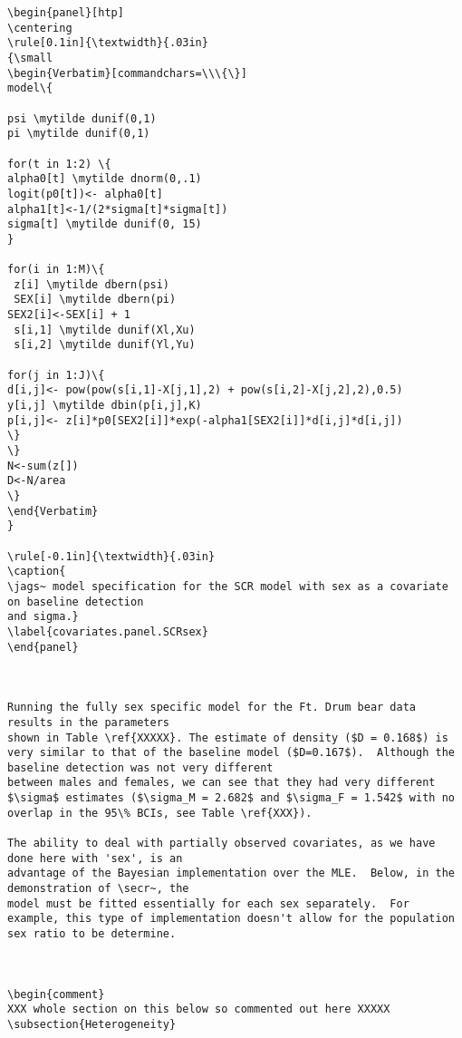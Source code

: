 {\begin{verbatim}
\begin{panel}[htp]
\centering
\rule[0.1in]{\textwidth}{.03in}
{\small
\begin{Verbatim}[commandchars=\\\{\}]
model\{

psi \mytilde dunif(0,1)
pi \mytilde dunif(0,1)

for(t in 1:2) \{
alpha0[t] \mytilde dnorm(0,.1)
logit(p0[t])<- alpha0[t]
alpha1[t]<-1/(2*sigma[t]*sigma[t])
sigma[t] \mytilde dunif(0, 15)
}

for(i in 1:M)\{
 z[i] \mytilde dbern(psi)
 SEX[i] \mytilde dbern(pi)
SEX2[i]<-SEX[i] + 1
 s[i,1] \mytilde dunif(Xl,Xu)
 s[i,2] \mytilde dunif(Yl,Yu)

for(j in 1:J)\{
d[i,j]<- pow(pow(s[i,1]-X[j,1],2) + pow(s[i,2]-X[j,2],2),0.5)
y[i,j] \mytilde dbin(p[i,j],K)
p[i,j]<- z[i]*p0[SEX2[i]]*exp(-alpha1[SEX2[i]]*d[i,j]*d[i,j])
\}
\}
N<-sum(z[])
D<-N/area
\}
\end{Verbatim}
}

\rule[-0.1in]{\textwidth}{.03in}
\caption{
\jags~ model specification for the SCR model with sex as a covariate on baseline detection
and sigma.}
\label{covariates.panel.SCRsex}
\end{panel}



Running the fully sex specific model for the Ft. Drum bear data results in the parameters
shown in Table \ref{XXXXX}. The estimate of density ($D = 0.168$) is very similar to that of the baseline model ($D=0.167$).  Although the baseline detection was not very different
between males and females, we can see that they had very different $\sigma$ estimates ($\sigma_M = 2.682$ and $\sigma_F = 1.542$ with no overlap in the 95\% BCIs, see Table \ref{XXX}). 

The ability to deal with partially observed covariates, as we have done here with 'sex', is an 
advantage of the Bayesian implementation over the MLE.  Below, in the demonstration of \secr~, the
model must be fitted essentially for each sex separately.  For example, this type of implementation doesn't allow for the population sex ratio to be determine.  



\begin{comment}
XXX whole section on this below so commented out here XXXXX
\subsection{Heterogeneity}


\end{verbatim}}

